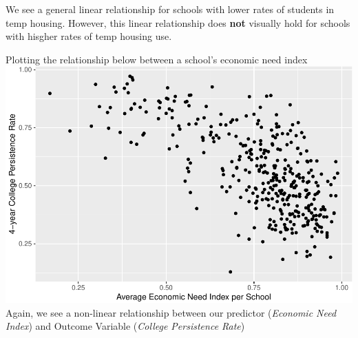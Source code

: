 \documentclass[
  man]{apa6}
\begin{document}
We see a general linear relationship for schools with lower rates of students in temp housing. However, this linear relationship does \textbf{not} visually hold for schools with hisgher rates of temp housing use.

Plotting the relationship below between a school's economic need index
\includegraphics{final-project_files/figure-latex/unnamed-chunk-8-1.pdf}
Again, we see a non-linear relationship between our predictor (\emph{Economic Need Index}) and Outcome Variable (\emph{College Persistence Rate})
\end{document}
